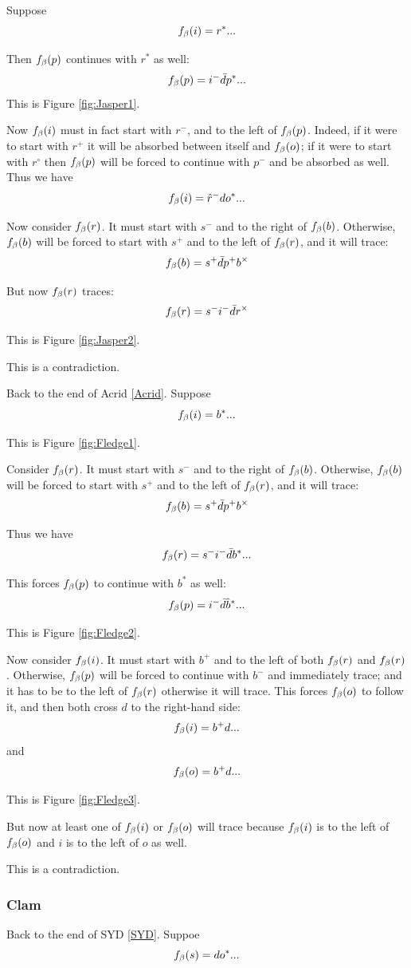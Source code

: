 \label{Jasper}
Suppose 
\[
f_\beta(i) = r^*...
\]

Then $f_\beta(p)$ continues with $r^*$ as well:
\[
f_\beta(p) = i^- \bar{d} p^*...
\]
This is Figure \ref{fig:Jasper1}.

Now $f_\beta(i)$ must in fact start with $r^-$, and to the left of $f_\beta(p)$. Indeed, if it were to start with $r^+$ it will be absorbed between itself and $f_\beta(o)$; if it were to start with $r^\circ$ then $f_\beta(p)$ will be forced to continue with $p^-$ and be absorbed as well. Thus we have
\[
f_\beta(i) = \hat{r}^- d o^*...
\]

Now consider $f_\beta(r)$. It must start with $s^-$ and to the right of $f_\beta(b)$. Otherwise, $f_\beta(b)$ will be forced to start with $s^+$ and to the left of $f_\beta(r)$, and it will trace:
\[
f_\beta(b) = s^+ \bar{d} p^+ b^\times
\]

But now $f_\beta(r)$ traces:
\[
f_\beta(r) = s^- i^- \bar{d} r^\times
\]

This is Figure \ref{fig:Jasper2}.

This is a contradiction.

\label{Fledge}
Back to the end of Acrid \ref{Acrid}. Suppose
\[
f_\beta(i) = b^*...
\]

This is Figure \ref{fig:Fledge1}.

Consider $f_\beta(r)$. It must start with $s^-$ and to the right of $f_\beta(b)$. Otherwise, $f_\beta(b)$ will be forced to start with $s^+$ and to the left of $f_\beta(r)$, and it will trace:
\[
f_\beta(b) = s^+ \bar{d} p^+ b^\times
\]

Thus we have
\[
f_\beta(r) = s^- i^- \bar{d} b^*...
\]

This forces $f_\beta(p)$ to continue with $b^*$ as well:
\[
f_\beta(p) = i^- \bar{d} \hat{b}^*...
\]

This is Figure \ref{fig:Fledge2}.

Now consider $f_\beta(i)$. It must start with $b^+$ and to the left of both $f_\beta(r)$ and $f_\beta(r)$. Otherwise, $f_\beta(p)$ will be forced to continue with $b^-$ and immediately trace; and it has to be to the left of $f_\beta(r)$ otherwise it will trace. This forces $f_\beta(o)$ to follow it, and then both cross $d$ to the right-hand side:
\[
f_\beta(i) = b^+ d...
\]
and
\[
f_\beta(o) = b^+ d...
\]

This is Figure \ref{fig:Fledge3}. 

But now at least one of $f_\beta(i)$ or $f_\beta(o)$ will trace because $f_\beta(i)$ is to the left of $f_\beta(o)$ and $i$ is to the left of $o$ as well.

This is a contradiction.

\subsubsection{Clam}\label{Clam}
Back to the end of SYD \ref{SYD}. Suppoe
\[
f_\beta(s) = d o^*...
\]

